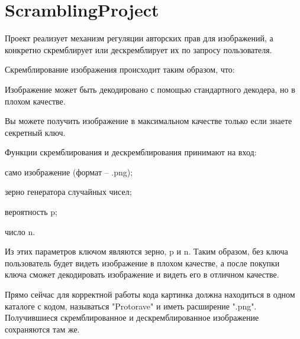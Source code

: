 \chapter{Scrambling\+Project}
\hypertarget{index}{}\label{index}
\label{index_md__r_e_a_d_m_e}%
%
Проект реализует механизм регуляции авторских прав для изображений, а конкретно скремблирует или дескремблирует их по запросу пользователя.

Скремблирование изображения происходит таким образом, что\+:
\begin{DoxyEnumerate}
\item Изображение может быть декодировано с помощью стандартного декодера, но в плохом качестве.
\item Вы можете получить изображение в максимальном качестве только если знаете секретный ключ.
\end{DoxyEnumerate}

Функции скремблирования и дескремблирования принимают на вход\+:
\begin{DoxyItemize}
\item само изображение (формат – .png);
\item зерно генератора случайных чисел;
\item вероятность p;
\item число n.
\end{DoxyItemize}

Из этих параметров ключом являются зерно, p и n. Таким образом, без ключа пользователь будет видеть изображение в плохом качестве, а после покупки ключа сможет декодировать изображение и видеть его в отличном качестве.

Прямо сейчас для корректной работы кода картинка должна находиться в одном каталоге с кодом, называться "{}\+Protorave"{} и иметь расширение "{}.\+png"{}. Получившиеся скремблированное и дескремблированное изображение сохраняются там же. 